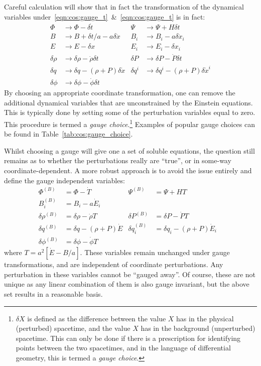 Careful calculation will show that in fact the transformation of the dynamical variables under~\eqref{eqn:cos:gauge_t}~\&~\eqref{eqn:cos:gauge_t} is in fact:
\begin{align}
  \Phi &\rightarrow \Phi - \delta \dot{t} &
  \Psi &\rightarrow \Psi +H \delta t  \nonumber\\
  B &\rightarrow B + \delta t/a - a\delta \dot{x} &
  B_i &\rightarrow  B_i - a \delta\dot{x}_i  \nonumber\\
  E &\rightarrow E - \delta x &
  E_i & \rightarrow E_i - \delta x_i \nonumber \\
  \delta\rho &\rightarrow \delta\rho - \dot{\rho}\delta t &
  \delta P &\rightarrow \delta P - \dot{P}\delta t \nonumber\\
  \delta q &\rightarrow \delta q - (\rho+P)\delta \dot{x}&
  \delta q^i &\rightarrow \delta q^i - (\rho+P)\delta \dot{x}^i \\
  \delta \phi &\rightarrow \delta \phi - \dot{\phi}\delta t &&\nonumber
\end{align}
By choosing an appropriate coordinate transformation, one can remove the additional dynamical variables that are unconstrained by the Einstein equations. This is typically done by setting some of the perturbation variables equal to zero. This procedure is termed a {\em gauge choice}.\footnote{$\delta X$ is defined as the difference between the value $X$ has in the physical (perturbed) spacetime, and the value $X$ has in the background (unperturbed) spacetime. This can only be done if there is a prescription for identifying points between the two spacetimes, and in the language of differential geometry, this is termed a {\em gauge choice}.}
Examples of popular gauge choices can be found in Table~\ref{tab:cos:gauge_choice}.

Whilst choosing a gauge will give one a set of soluble equations, the question still remains as to whether the perturbations really are ``true'', or in some-way coordinate-dependent. A more robust approach is to avoid the issue entirely and define the gauge independent variables:
\begin{align}
  \Phi^{(B)} &=  \Phi - \dot{T} &
  \Psi^{(B)} &=  \Psi + HT \nonumber \\
  B_i^{(B)} &= B_i - a\dot{E}_i & & \nonumber\\
  \delta\rho^{(B)} &= \delta\rho - \dot{\rho}T &
  \delta P^{(B)} &= \delta P - \dot{P}T & \nonumber\\
  \delta q^{(B)} &= \delta q - (\rho + P)\dot{E} &
  \delta q_i^{(B)} &= \delta q_i - (\rho + P)\dot{E}_i \nonumber \\
  \delta \phi^{(B)} &= \delta \phi - \dot{\phi}T & &
\end{align}
where $T = a^2[\dot{E}-B/a]$. These variables remain unchanged under gauge transformations, and are independent of coordinate perturbations. Any perturbation in these variables cannot be ``gauged away''. Of course, these are not unique as any linear combination of them is also gauge invariant, but the above set results in a reasonable basis. 


